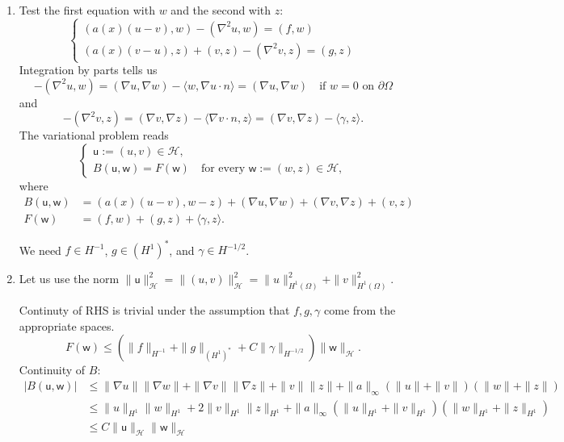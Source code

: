 \documentclass[letterpaper,twoside,11pt]{article}
\theoremstyle{mystyle}
\begin{document}
\begin{enumerate}
  \item Test the first equation with $w$ and the second with $z$: 
  \[\left\{ {\begin{array}{*{20}{l}}
    \left( a(x) (u-v), w \right) - \left( \nabla^2 u, w \right) = \left( f, w \right) \\[.2cm] 
    \left( a(x)(v-u), z \right) + \left( v, z \right) - \left( \nabla^2 v, z \right) = \left( g, z \right)
  \end{array}} \right.\]
  Integration by parts tells us 
  \[-\left( \nabla^2 u, w \right) = \left( \nabla u, \nabla w \right) - \langle w, \nabla u\cdot n \rangle = \left( \nabla u, \nabla w \right) \quad \text{if } w = 0 \text{ on } \partial \Omega\]
  and
  \[-\left( \nabla^2 v, z \right) = \left( \nabla v, \nabla z \right) - \langle \nabla v \cdot n, z\rangle = \left( \nabla v, \nabla z \right) - \langle \gamma , z\rangle.\]
  The variational problem reads 
  \[\left\{ {\begin{array}{*{20}{l}}
    \mathsf u := \left( u,v \right)\in \mathcal H,\\[.2cm]
    B\left( \mathsf u, \mathsf w \right) = F\left( \mathsf w \right)
    \quad \text{for every } \mathsf w :=\left( w, z \right)\in \mathcal H,
  \end{array}} \right.\]
  where 
  \begin{align*}
    B\left( \mathsf u, \mathsf w \right) &= \left( a(x) (u-v), w-z \right) + \left( \nabla u, \nabla w \right) + \left( \nabla v, \nabla z \right) + \left( v, z \right) \\
    F\left( \mathsf w \right) &= \left( f, w \right) + \left( g, z \right) + \langle \gamma, z\rangle.
  \end{align*}

  We need $f \in H^{-1}$, $g \in \left( H^1  \right)^*$, and $\gamma \in H^{-1/2}$. 

  \item Let us use the norm $\|\mathsf u\|_{\mathcal H}^2 = \|\left( u,v \right)\|^2_{\mathcal H} = \|u\|^2_{H^1\left( \Omega \right)} + \|v\|^2_{H^1\left( \Omega \right)}$. 
  
  Continuty of RHS is trivial under the assumption that $f, g, \gamma$ come from the appropriate spaces. 
  \[F\left( \mathsf w \right) \leq \left( \|f\|_{H^{-1}} + \|g\|_{(H^1)^*} + C \|\gamma\|_{H^{-1/2}} \right) \|\mathsf w \|_{\mathcal H}.\]
  Continuity of $B$: 
\begin{align*}
  |B\left( \mathsf{u,w} \right)| &\leq \|\nabla u \| \|\nabla w \| + \|\nabla v \| \| \nabla z \|+\|v\|\|z\| + \|a\|_{\infty} \left( \|u\| + \|v\|  \right)\left( \|w\| + \|z\| \right)\\[.2cm]
  &\leq \|u\|_{H^1} \|w\|_{H^1} + 2\|v\|_{H^1}\|z\|_{H^1} + \|a\|_{\infty} \left( \|u\|_{H^1} + \|v\|_{H^1}  \right)\left( \|w\|_{H^1} + \|z\|_{H^1} \right)\\[.2cm]
  &\leq C \|\mathsf u \|_{\mathcal H} \|\mathsf w\|_{\mathcal H}
\end{align*}





\end{enumerate}
\end{document}
